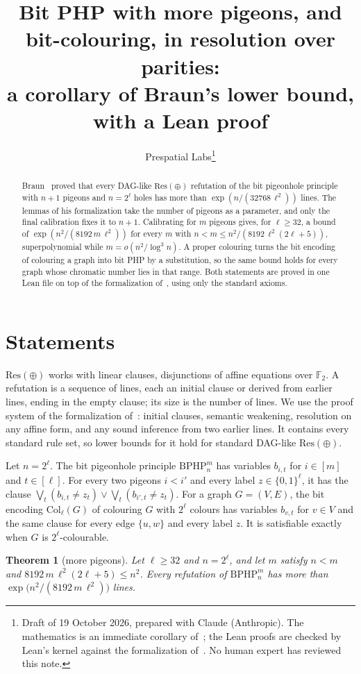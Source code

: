 \documentclass[11pt]{article}
\title{Bit PHP with more pigeons, and bit-colouring, in resolution over parities:\\
a corollary of Braun's lower bound, with a Lean proof}
\author{Prespatial Labs\thanks{Draft of 19 October 2026, prepared with Claude
(Anthropic). The mathematics is an immediate corollary of~\cite{Br26}; the Lean
proofs are checked by Lean's kernel against the formalization of~\cite{Br26}.
No human expert has reviewed this note.}}
\date{}
\newtheorem{theorem}{Theorem}
\theoremstyle{remark}
\newcommand{\Res}{\mathrm{Res}(\oplus)}
\newcommand{\BPHP}{\mathrm{BPHP}}
\newcommand{\Col}{\mathrm{Col}}
\begin{document}
\maketitle

\begin{abstract}
Braun~\cite{Br26} proved that every DAG-like $\Res$ refutation of the bit
pigeonhole principle with $n+1$ pigeons and $n=2^\ell$ holes has more than
$\exp(n/(32768\,\ell^2))$ lines. The lemmas of his formalization take the number
of pigeons as a parameter, and only the final calibration fixes it to $n+1$.
Calibrating for $m$ pigeons gives, for $\ell\ge32$, a bound of
$\exp(n^2/(8192\,m\,\ell^2))$ for every $m$ with $n<m\le n^2/(8192\,\ell^2(2\ell+5))$, superpolynomial while
$m=o(n^2/\log^3 n)$. A proper colouring turns the bit encoding of colouring a
graph into bit PHP by a substitution, so the same bound holds for every graph
whose chromatic number lies in that range. Both statements are proved in one
Lean file on top of the formalization of~\cite{Br26}, using only the standard
axioms.
\end{abstract}

\section{Statements}

$\Res$ works with linear clauses, disjunctions of affine equations over
$\mathbb F_2$. A refutation is a sequence of lines, each an initial clause or
derived from earlier lines, ending in the empty clause; its size is the number
of lines. We use the proof system of the formalization of~\cite{Br26}: initial
clauses, semantic weakening, resolution on any affine form, and any sound
inference from two earlier lines. It contains every standard rule set, so
lower bounds for it hold for standard DAG-like $\Res$.

Let $n=2^\ell$. The bit pigeonhole principle $\BPHP^m_n$ has variables
$b_{i,t}$ for $i\in[m]$ and $t\in[\ell]$. For every two pigeons $i<i'$ and
every label $z\in\{0,1\}^\ell$, it has the clause
$\bigvee_t (b_{i,t}\ne z_t)\vee\bigvee_t (b_{i',t}\ne z_t)$. For a graph
$G=(V,E)$, the bit encoding $\Col_\ell(G)$ of colouring $G$ with $2^\ell$
colours has variables $b_{v,t}$ for $v\in V$ and the same clause for every
edge $\{u,w\}$ and every label $z$. It is satisfiable exactly when $G$ is
$2^\ell$-colourable.

\begin{theorem}[more pigeons]\label{thm:more}
Let $\ell\ge 32$ and $n=2^\ell$, and let $m$ satisfy $n<m$ and
$8192\,m\,\ell^2(2\ell+5)\le n^2$. Every refutation of $\BPHP^m_n$ has more
than $\exp\bigl(n^2/(8192\,m\,\ell^2)\bigr)$ lines.
\end{theorem}
\end{document}
